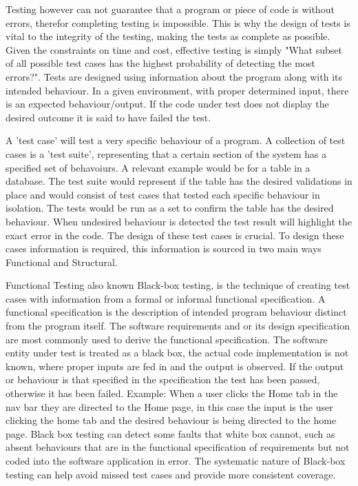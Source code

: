 \documentclass[a4paper,12pt]{article}
\begin{document}
\vspace{3mm}
\par Testing however can not guarantee that a program or piece of code is without errors, therefor completing testing is impossible. This is why the design of tests is vital to the integrity of the testing, making the tests as complete as possible. Given the constraints on time and cost, effective testing is simply "What subset of all possible test cases has the highest probability of detecting the most errors?"\cite{myers2011art}. Tests are designed using information about the program along with its intended behaviour. In a given environment, with proper determined input, there is an expected behaviour/output. If the code under test does not display the desired outcome it is said to have failed the test. 
\vspace{3mm}
\par A 'test case' will test a very specific behaviour of a program. A collection of test cases is a 'test suite', representing that a certain section of the system has a specified set of behavoiurs. A relevant example would be for a table in a database. The test suite would represent if the table has the desired validations in place and would consist of test cases that tested each specific behaviour in isolation. The tests would be run as a set to confirm the table has the desired behaviour. When undesired behaviour is detected the test result will highlight the exact error in the code. The design of these test cases is crucial. To design these cases information is required, this information is sourced in two main ways Functional and Structural.
\vspace{3mm}
\par  Functional Testing also known Black-box testing, is the technique of creating test cases with information from a formal or informal functional specification. A functional specification is the description of intended program behaviour distinct from the program itself. The software requirements and or its design specification are most commonly used to derive the functional specification. The software entity under test is treated as a black box, the actual code implementation is not known, where proper inputs are fed in and the output is observed. If the output or behaviour is that specified in the specification the test has been passed, otherwise it has been failed. Example: When a user clicks the Home tab in the nav bar they are directed to the Home page, in this case the input is the user clicking the home tab and the desired behaviour is being directed to the home page. Black box testing can detect some faults that white box cannot, such as absent behaviours that are in the functional specification of requirements but not coded into the software application in error. The systematic nature of Black-box testing can help avoid missed test cases and provide more consistent coverage.\cite{nidhra2012blackbox}\cite{young2008software}
\end{document}
